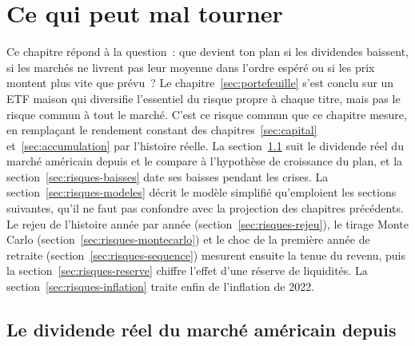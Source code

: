 \section{Ce qui peut mal tourner}\label{sec:risques}

Ce chapitre r\'epond \`a la question~: que devient ton plan si les dividendes baissent, si les
march\'es ne livrent pas leur moyenne dans l'ordre esp\'er\'e ou si les prix montent plus vite que
pr\'evu~? Le chapitre~\ref{sec:portefeuille} s'est conclu sur un ETF maison qui diversifie l'essentiel
du risque propre \`a chaque titre, mais pas le risque commun \`a tout le march\'e. C'est ce risque
commun que ce chapitre mesure, en rempla\c{c}ant le rendement constant des chapitres~\ref{sec:capital}
et~\ref{sec:accumulation} par l'histoire r\'eelle. La section~\ref{sec:risques-histoire} suit le
dividende r\'eel du march\'e am\'ericain depuis \ShillerDebut{} et le compare \`a l'hypoth\`ese de
croissance du plan, et la section~\ref{sec:risques-baisses} date ses baisses pendant les crises. La
section~\ref{sec:risques-modeles} d\'ecrit le mod\`ele simplifi\'e qu'emploient les sections
suivantes, qu'il ne faut pas confondre avec la projection des chapitres pr\'ec\'edents. Le rejeu de
l'histoire ann\'ee par ann\'ee (section~\ref{sec:risques-rejeu}), le tirage Monte Carlo
(section~\ref{sec:risques-montecarlo}) et le choc de la premi\`ere ann\'ee de retraite
(section~\ref{sec:risques-sequence}) mesurent ensuite la tenue du revenu, puis la
section~\ref{sec:risques-reserve} chiffre l'effet d'une r\'eserve de liquidit\'es. La
section~\ref{sec:risques-inflation} traite enfin de l'inflation de 2022.

\subsection{Le dividende r\'eel du march\'e am\'ericain depuis \ShillerDebut}\label{sec:risques-histoire}

